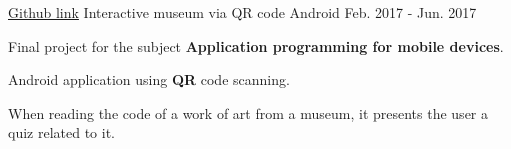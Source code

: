 \begin{cventries}
  \cventry
    {\href{https://github.com/matl1995/PDM/tree/master/Museo}{Github link}} %
    {Interactive museum via QR code} %
    {Android} %
    {Feb. 2017 - Jun. 2017} %
    {
      \begin{cvitems} %
        \item {Final project for the subject \textbf{Application programming for mobile devices}.}
        \item {Android application using \textbf{QR} code scanning.}
        \item {When reading the code of a work of art from a museum, it presents the user a quiz related to it.}
      \end{cvitems}
    }

\end{cventries}
